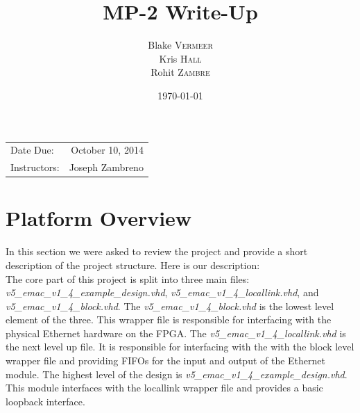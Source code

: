 \documentclass{article}
\title{MP-2 Write-Up} %
\author{Blake \textsc{Vermeer}\\
		Kris \textsc{Hall}\\
		Rohit \textsc{Zambre}} %
\date{\today} %
\begin{document}
\maketitle %

\begin{center}
\begin{tabular}{l r}
Date Due: & October 10, 2014 \\ %
Instructors: & Joseph Zambreno %
\end{tabular}
\end{center}








\section{Platform Overview}
In this section we were asked to review the project and provide a short description of the project structure. Here is our description: \\

The core part of this project is split into three main files: \textit{v5\_emac\_v1\_4\_example\_design.vhd}, \textit{v5\_emac\_v1\_4\_locallink.vhd}, and \textit{v5\_emac\_v1\_4\_block.vhd}. The \textit{v5\_emac\_v1\_4\_block.vhd} is the lowest level element of the three. This wrapper file is responsible for interfacing with the physical Ethernet hardware on the FPGA. The \textit{v5\_emac\_v1\_4\_locallink.vhd} is the next level up file. It is responsible for interfacing with the with the block level wrapper file and providing FIFOs for the input and output of the Ethernet module. The highest level of the design is \textit{v5\_emac\_v1\_4\_example\_design.vhd}. This module interfaces with the locallink wrapper file and provides a basic loopback interface.
\end{document}
